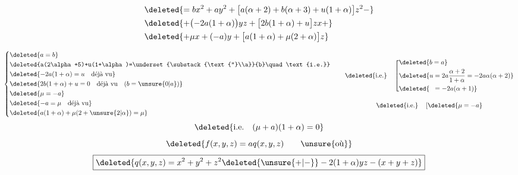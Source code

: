\[
\begin{aligned}
&\deleted{=bx^2+ay^2+\bigl[a(\alpha+2)+b(\alpha+3)+u(1+\alpha)\bigr]z^2-}\\
&\deleted{+\bigl(-2a(1+\alpha)\bigr)yz+\bigl[2b(1+\alpha)+u\bigr]zx+}\\
&\deleted{+\mu x+(-a)y+\bigl[a(1+\alpha)+\mu(2+\alpha)\bigr]z}
\end{aligned}
\]

\[
\left\{\begin{aligned}
&\deleted{a=b}\\
&\deleted{a(2\alpha+5)+u(1+\alpha)=\underset{\substack{\text{''}\\a}}{b}\quad\text{i.e.}}\\
&\deleted{-2a(1+\alpha)=u\quad\text{déjà vu}}\\
&\deleted{2b(1+\alpha)+u=0\quad\text{déjà vu}\quad(b=\unsure{0|a})}\\
&\deleted{\mu=-a}\\
&\deleted{-a=\mu\quad\text{déjà vu}}\\
&\deleted{a(1+\alpha)+\mu(2+\unsure{2|\alpha})=\mu}
\end{aligned}\right.
\qquad
\begin{gathered}
\deleted{\text{i.e.}}\quad
\left[\begin{aligned}
&\deleted{b=a}\\
&\deleted{u=2a\frac{\alpha+2}{1+\alpha}=-2a\alpha(\alpha+2)}\\
&\deleted{\hphantom{u}=-2a(\alpha+1)}
\end{aligned}\right.\\[1em]
\deleted{\text{i.e.}}\quad\left[\deleted{\mu=-a}\right.
\end{gathered}
\]
\[
\deleted{\text{i.e.}\quad(\mu+a)(1+\alpha)=0}
\]
\[
\deleted{f(x,y,z)=aq(x,y,z)\qquad\text{\unsure{où}}}
\]
\[
\boxed{\deleted{q(x,y,z)=x^2+y^2+z^2\deleted{\unsure{+|-}}-2(1+\alpha)yz-(x+y+z)}}
\]
